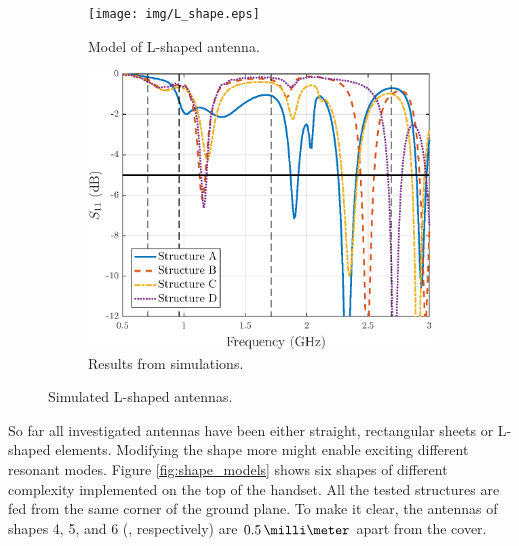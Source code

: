 \begin{figure}[H]
    \centering
    \begin{subfigure}[b]{0.49\textwidth}
        \texttt{[image: img/L\_shape.eps]}
        \caption{Model of L-shaped antenna.}
        \label{fig:l_shape_model}
    \end{subfigure}
    \begin{subfigure}[b]{0.49\textwidth}
        \includegraphics[width=\textwidth]{img/L_shape_res.eps}
        \caption{Results from simulations.}
        \label{fig:l_shape_res}
    \end{subfigure}
    \caption{Simulated L-shaped antennas.}
    \label{fig:l_shape}
\end{figure}

So far all investigated antennas have been either straight, rectangular sheets or L-shaped elements. Modifying the shape more might enable exciting different resonant modes. Figure \ref{fig:shape_models} shows six shapes of different complexity implemented on the top of the handset. All the tested structures are fed from the same corner of the ground plane. To make it clear, the antennas of shapes 4, 5, and 6 (, respectively) are $0.5\,\milli\meter$ apart from the cover.

